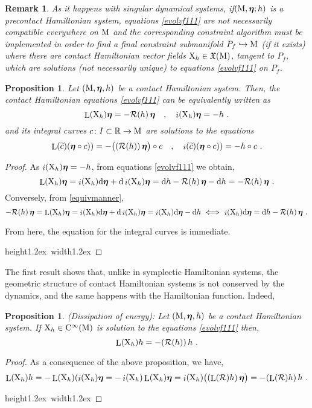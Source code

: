 \documentclass[12pt]{report}
\newtheorem{prop}[teor]{Proposition}
\newtheorem{remark}[teor]{Remark}
\def\beq{\begin{equation}}
\def\eeq{\end{equation}}
\def\qed{\ifvmode\removelastskip\fi
{\unskip\nobreak\hfil\penalty50\hbox{}\nobreak\hfil
\hbox{\vrule height1.2ex width1.2ex}\parfillskip=0pt
\finalhyphendemerits=0 \par\smallskip}}
\def\vf{\mathfrak X}
\def\d{{\rm d}}
\def\Real{\mathbb{R}}
\def\bmeta{\mbox{\boldmath $\eta$}}
\def\X{{\rm X}}
\def\Lie{\mathop{\rm L}\nolimits}
\def\inn{\mathop{i}\nolimits}
\def\Cinfty{{\rm C}^\infty}
\newcommand{\Reeb}{\mathcal{R}}
\begin{document}
\begin{remark}{\rm 
As it happens with singular dynamical systems,
if$({\rm M},\bmeta;h)$ is a precontact Hamiltonian system,
equations \eqref{evolvf111} are not necessarily compatible everywhere on ${\rm M}$ 
and the corresponding constraint algorithm must be implemented in order to find 
a {\sl final constraint submanifold} $P_f\hookrightarrow {\rm M}$
(if it exists) where there are contact Hamiltonian vector fields $\X_h\in\vf({\rm M})$,
tangent to $P_f$, which are solutions (not necessarily unique) to equations \eqref{evolvf111} on $P_f$.
}\end{remark}

\begin{prop}
Let $({\rm M},\bmeta,h)$ be a contact Hamiltonian system.
Then, the contact Hamiltonian equations \eqref{evolvf111} can be equivalently written as
\begin{equation}
 \Lie(\X_h)\bmeta= -\Reeb(h)\,\bmeta \quad ,\quad  \inn(\X_h)\bmeta = -h \ .
 \label{equivmanner}
\end{equation}
and its integral curves $c\colon I\subset\Real\to {\rm M}$  are solutions to the equations
\begin{equation*}
 \Lie(\widetilde c)(\bmeta\circ c))= -\big((\Reeb(h))\,\bmeta\big)\circ c \quad ,\quad  \inn(\widetilde c)(\bmeta\circ c)) = -h\circ c  \ .
\end{equation*}
\end{prop}
\begin{proof}
As $\inn(\X_h)\bmeta=-h$, from equations \eqref{evolvf111} we obtain,
$$
\Lie(\X_h)\bmeta=
\inn(\X_h)\d\bmeta+\d\inn(\X_h)\bmeta=
\d h-\Reeb(h)\,\bmeta-\d h=-\Reeb(h)\,\bmeta \ .
$$
Conversely, from \eqref{equivmanner},
$$
-\Reeb(h)\,\bmeta=\Lie(\X_h)\bmeta= 
\inn(\X_h)\d\bmeta+\d\inn(\X_h)\bmeta=
\inn(\X_h)\d\bmeta-\d h \ \Longleftrightarrow \
\inn(\X_h)\d\bmeta=\d h-\Reeb(h)\,\bmeta \ .
$$

From here, the equation for the integral curves is immediate. 
\\ \qed\end{proof}

The first result shows that,
unlike in symplectic Hamiltonian systems, the geometric structure of contact Hamiltonian systems is not conserved by the dynamics,
and the same happens with the Hamiltonian function. Indeed,

\begin{prop} {\rm (Dissipation of energy):}
Let $({\rm M},\bmeta,h)$ be a contact Hamiltonian system. If $\X_h\in\Cinfty({\rm M})$ is solution to the equations \eqref{evolvf111} then,
\beq
\Lie(\X_h)h=-(\Reeb(h))\,h \ .
\label{eq:disipenerg}
\eeq
\label{disipenerg}
\end{prop}
\vspace{-1cm}
\begin{proof}
As a consequence of the above proposition, we have,
$$
\Lie(\X_h)h=-\Lie(\X_h)(\inn(\X_h)\bmeta=
-\inn(\X_h)\Lie(\X_h)\bmeta=
\inn(\X_h)\big((\Lie(\Reeb)h)\,\bmeta\big)=-(\Lie(\Reeb)h)\,h\ .
$$
\qed\end{proof}
\end{document}
